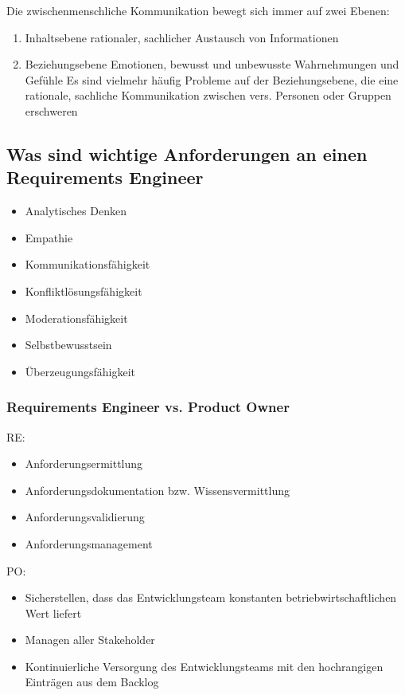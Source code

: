\documentclass{report}
\theoremstyle{definition}
\theoremstyle{example}
\begin{document}
Die zwischenmenschliche Kommunikation bewegt sich immer auf zwei Ebenen:
\begin{enumerate}
   \item Inhaltsebene
   \subitem rationaler, sachlicher Austausch von Informationen 
   \item Beziehungsebene
   \subitem Emotionen, bewusst und unbewusste Wahrnehmungen und Gefühle
   \subitem Es sind vielmehr häufig Probleme auf der Beziehungsebene, die eine rationale, sachliche Kommunikation zwischen vers. Personen oder Gruppen erschweren
\end{enumerate}

\subsection{Was sind wichtige Anforderungen an einen Requirements Engineer}
\begin{itemize}
   \item Analytisches Denken
   \item Empathie
   \item Kommunikationsfähigkeit
   \item Konfliktlösungsfähigkeit
   \item Moderationsfähigkeit
   \item Selbstbewusstsein
   \item Überzeugungsfähigkeit
\end{itemize}

   \subsubsection{Requirements Engineer vs. Product Owner}
RE:
\begin{itemize}
   \item Anforderungsermittlung
   \item Anforderungsdokumentation bzw. Wissensvermittlung
   \item Anforderungsvalidierung
   \item Anforderungsmanagement
\end{itemize}

PO:
\begin{itemize}
   \item Sicherstellen, dass das Entwicklungsteam konstanten betriebwirtschaftlichen Wert liefert
   \item Managen aller Stakeholder
   \item Kontinuierliche Versorgung des Entwicklungsteams mit den hochrangigen Einträgen aus dem Backlog
\end{itemize}
\end{document}
